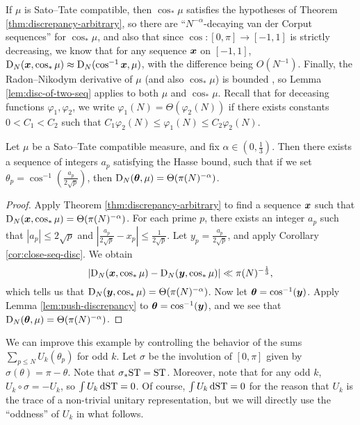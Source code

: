 If $\mu$ is Sato--Tate compatible, then $\cos_\ast\mu$ 
satisfies the hypotheses of Theorem \ref{thm:discrepancy-arbitrary}, so 
there are ``$N^{-\alpha}$-decaying van der Corput sequences'' for 
$\cos_\ast\mu$, and also that since $\cos\colon [0,\pi] \to [-1,1]$ is 
strictly decreasing, we know that for any sequence ${\boldsymbol x}$ on $[-1,1]$, 
$\operatorname{D}_N({\boldsymbol x},\cos_\ast\mu) \approx \operatorname{D}_N(\cos^{-1}{\boldsymbol x},\mu)$, with the 
difference being $O(N^{-1})$.  Finally, the 
Radon--Nikodym derivative of $\mu$ (and also $\cos_\ast\mu$) is bounded , so 
Lemma \ref{lem:disc-of-two-seq} applies to both $\mu$ and $\cos_\ast\mu$. 
Recall that for deceasing functions 
$\varphi_1,\varphi_2$, we write $\varphi_1(N) = \Theta(\varphi_2(N))$ if 
there exists constants $0 < C_1 < C_2$ such that 
$C_1 \varphi_2(N) \leqslant \varphi_1(N) \leqslant C_2 \varphi_2(N)$. 


\begin{theorem}\label{thm:integral-a_p-alpha}
Let $\mu$ be a Sato--Tate compatible measure, and fix 
$\alpha\in \left(0,\frac 1 3\right)$. 
Then there exists a sequence of integers $a_p$ satisfying the Hasse bound, 
such that if we set $\theta_p = \cos^{-1}\left(\frac{a_p}{2\sqrt p}\right)$, 
then $\operatorname{D}_N({\boldsymbol\theta},\mu) = \Theta(\pi(N)^{-\alpha})$. 
\end{theorem}
\begin{proof}
Apply Theorem \ref{thm:discrepancy-arbitrary} to find a sequence ${\boldsymbol x}$ such 
that $\operatorname{D}_N({\boldsymbol x},\cos_\ast \mu) = \Theta(\pi(N)^{-\alpha})$. For each prime 
$p$, there exists an integer $a_p$ such that $|a_p|\leqslant 2\sqrt p$ and 
$\left| \frac{a_p}{2\sqrt p} - x_p\right| \leqslant \frac{1}{2\sqrt p}$. Let 
$y_p = \frac{a_p}{2\sqrt p}$, and apply Corollary \ref{cor:close-seq-disc}. 
We obtain 
\[
	\left| \operatorname{D}_N({\boldsymbol x},\cos_\ast \mu) - \operatorname{D}_N({\boldsymbol y}, \cos_\ast \mu)\right| \ll  \pi(N)^{-\frac 1 3} ,
\]
which tells us that $\operatorname{D}_N({\boldsymbol y},\cos_\ast\mu) = \Theta(\pi(N)^{-\alpha})$. 
Now let ${\boldsymbol\theta} = \cos^{-1}({\boldsymbol y})$. Apply Lemma \ref{lem:push-discrepancy} to 
${\boldsymbol\theta} = \cos^{-1}({\boldsymbol y})$, and we see that 
$\operatorname{D}_N({\boldsymbol\theta},\mu) = \Theta(\pi(N)^{-\alpha})$. 
\end{proof}

We can improve this example by controlling the behavior of the sums 
$\sum_{p\leqslant N} U_k(\theta_p)$ for odd $k$. Let $\sigma$ be 
the involution of $[0,\pi]$ given by $\sigma(\theta) = \pi-\theta$. Note that 
$\sigma_\ast \mathrm{ST} = \mathrm{ST}$. Moreover, note that for any odd $k$, 
$U_k\circ\sigma = - U_k$, so $\int U_k\, \mathrm{d}\mathrm{ST} = 0$. Of course, 
$\int U_k \,\mathrm{d}\mathrm{ST} = 0$ for the reason that $U_k$ is the trace of a 
non-trivial unitary representation, but we will directly use the ``oddness'' 
of $U_k$ in what follows.

